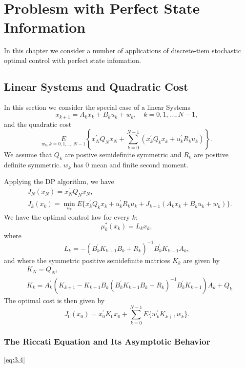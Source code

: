 \chapter{Problesm with Perfect State Information}
In this chapter we consider a number of applications of discrete-tiem stochastic optimal control with perfect state infomation.

\section{Linear Systems and Quadratic Cost}
In this section we consider the special case of a linear Systems
\begin{equation*}
    x_{k + 1} = A_k x_k + B_k u_k + w_k,\quad k = 0,1,\dots,N - 1,
\end{equation*}
and the quadratic cost \begin{equation*}
    \underset{w_k,k = 0,1,\dots,N - 1}{E}\left\{x_N^\prime Q_N x_N +\sum_{k = 0}^{N - 1}(x_k^\prime Q_k x_k + u_k^\prime R_k u_k) \right\}.
\end{equation*}
We assume that $Q_k$ are postive semidefinite symmetric and $R_k$ are positive definite symmetric. $w_k$ has 0 mean and finite second moment.

Applying the DP algorithm, we have 
\begin{align}
    &J_N(x_N) = x_N^\prime Q_N x_N,\nonumber\\
    &J_k(x_k) =\min_{u_k}E\{x_k^\prime Q_k x_k + u_k^\prime R_k u_k + J_{k + 1}(A_k x_k + B_k u_k + w_k)\}.
\end{align}
We have the optimal control law for every $k$:
\begin{equation}
    \mu_k^*(x_k) = L_k x_k,
\end{equation}
where 
\[L_k = -(B_k^\prime K_{k + 1}B_k + R_k)^{ - 1}B_k^\prime K_{k + 1} A_k,\] 
and where the symmetric positive semidefinite matrices $K_k$ are given by 
\begin{align}
    &K_N = Q_N,\\
    &K_k = A_k^\prime(K_{k + 1} - K_{k + 1}B_k(B_k^\prime K_{k + 1}B_k + R_k)^{ - 1}B_k^\prime K_{k + 1})A_k + Q_k \label{eq:3.4}
\end{align}
The optimal cost is then given by 
\[J_0 (x_0) = x_0^\prime K_0 x_0 + \sum_{k = 0}^{N - 1}E\{w_k^\prime K_{k + 1}w_k\}.\]

\subsection*{The Riccati Equation and Its Asymptotic Behavior}

\autoref{eq:3.4}